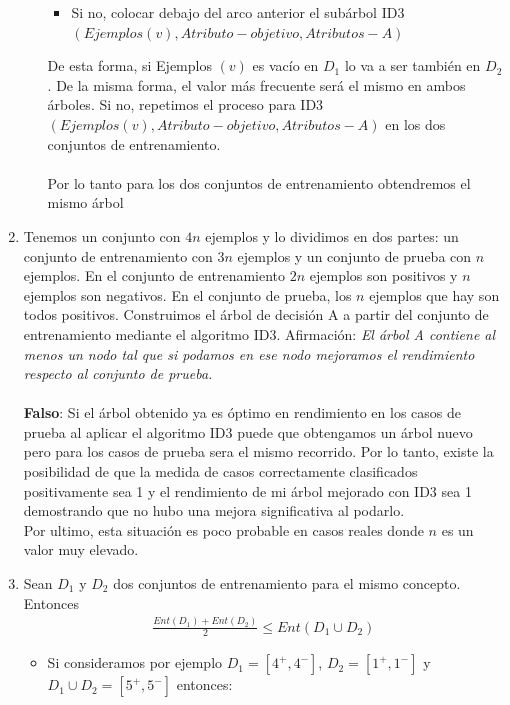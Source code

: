\documentclass{article}
\begin{document}
\begin{enumerate}
\begin{itemize}
        \begin{itemize}
        \item Si no, colocar debajo del arco anterior el subárbol ID3 $(Ejemplos(v), Atributo-objetivo,
Atributos-A)$
        \end{itemize}
    De esta forma, si Ejemplos $(v)$ es vacío en $D_1$ lo va a ser también en $D_2$. De la misma forma, el valor más frecuente será el mismo en ambos árboles. Si no, repetimos el proceso para ID3 $(Ejemplos(v), Atributo-objetivo,Atributos-A)$ en los dos conjuntos de entrenamiento.\\\\
    Por lo tanto para los dos conjuntos de entrenamiento obtendremos el mismo árbol
    \end{itemize}
    \item Tenemos un conjunto con $4n$ ejemplos y lo dividimos en dos partes: un conjunto de entrenamiento con $3n$ ejemplos y un conjunto de prueba con $n$ ejemplos. En el conjunto de entrenamiento $2n$ ejemplos son positivos y $n$ ejemplos son negativos. En el conjunto de prueba, los $n$ ejemplos que hay son todos positivos. Construimos el árbol de decisión A a partir del conjunto de entrenamiento mediante el algoritmo ID3. Afirmación: \emph{El árbol A contiene al menos un nodo tal que si podamos en ese nodo mejoramos el rendimiento respecto al conjunto de prueba.}\\\\
    \textbf{Falso}: Si el árbol obtenido ya es óptimo en rendimiento en los casos de prueba al aplicar el algoritmo ID3 puede que obtengamos un árbol nuevo pero para los casos de prueba sera el mismo recorrido. Por lo tanto, existe la posibilidad de que la medida de casos correctamente clasificados positivamente sea 1 y el rendimiento de mi árbol mejorado con ID3 sea 1 demostrando que no hubo una mejora significativa al podarlo.\\
    Por ultimo, esta situación es poco probable en casos reales donde $n$ es un valor muy elevado.
    \item Sean $D_1$ y $D_2$ dos conjuntos de entrenamiento para el mismo concepto. Entonces
    \begin{align}
        \frac{Ent(D_1)+Ent(D_2)}{2}\le Ent(D_1\cup D_2)
    \end{align}
    \begin{itemize}
    \item  Si consideramos por ejemplo $D_1 = [4^+,4^-]$, $D_2 = [1^+,1^-]$ y $D_1 \cup D_2 = [5^+,5^-]$ entonces:\\\\

\end{itemize}
\end{enumerate}
\end{document}
